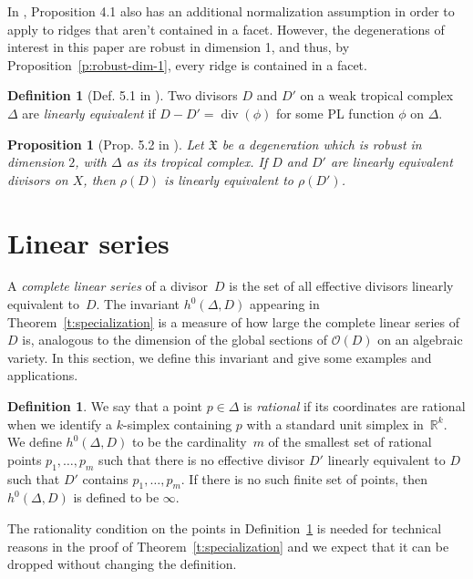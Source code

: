 \documentclass[11pt]{amsart}
\newtheorem{prop}[thm]{Proposition}
\theoremstyle{definition}
\newtheorem{defn}[thm]{Definition}
\newcommand{\defi}[1]{\emph{#1}}
\renewcommand{\div}{\operatorname{div}}
\newcommand{\RR}{\mathbb R}
\newcommand{\X}{\mathfrak X}
\begin{document}
In \cite{cartwright-complexes}, Proposition 4.1 also has an additional
normalization assumption in order to apply to ridges that aren't contained in a
facet. However, the degenerations of interest in this paper are robust in
dimension 1, and thus, by Proposition~\ref{p:robust-dim-1}, every ridge is
contained in a facet.

\begin{defn}[Def. 5.1 in \cite{cartwright-complexes}]\label{d:equivalence}
Two divisors $D$ and $D'$ on a weak tropical complex~$\Delta$ are \defi{linearly
equivalent} if $D-D' = \div(\phi)$ for some PL function $\phi$ on $\Delta$.
\end{defn}

\begin{prop}[Prop. 5.2 in \cite{cartwright-complexes}]\label{p:lin-equivalent}
Let $\X$ be a degeneration which is robust in dimension $2$, with $\Delta$ as
its tropical complex. If $D$ and $D'$ are linearly equivalent divisors on $X$,
then $\rho(D)$ is linearly equivalent to $\rho(D')$.
\end{prop}

\section{Linear series}\label{s:linear-series}

A \defi{complete linear series} of a divisor~$D$ is the set of all effective
divisors linearly equivalent to~$D$. The invariant $h^0(\Delta, D)$ appearing in
Theorem~\ref{t:specialization} is a measure of how large the complete linear
series of~$D$ is, analogous to the dimension of the global sections of $\mathcal
O(D)$ on an algebraic variety. In this section, we define this invariant and
give some examples and applications.

\begin{defn}\label{d:h0}
We say that a point $p \in \Delta$ is \defi{rational} if its coordinates are
rational when we identify a $k$-simplex containing $p$ with a standard unit
simplex in~$\RR^k$. We define $h^0(\Delta, D)$ to be the cardinality~$m$ of the
smallest set of rational points $p_1, \ldots, p_m$ such that there is no
effective divisor $D'$ linearly equivalent to $D$ such that $D'$ contains $p_1,
\ldots, p_m$. If there is no such finite set of points, then $h^0(\Delta, D)$ is
defined to be $\infty$.
\end{defn}

The rationality condition on the points in Definition~\ref{d:h0} is needed
for technical reasons in the proof of Theorem~\ref{t:specialization} and we
expect that it can be dropped without changing the definition.
\end{document}
